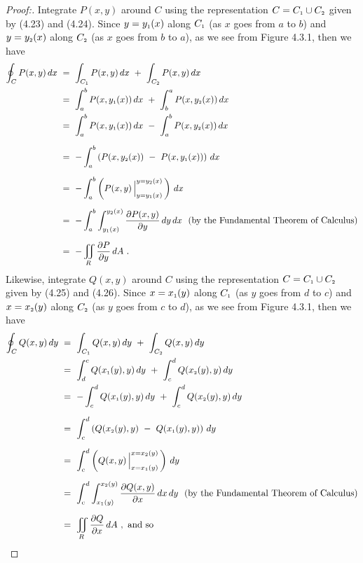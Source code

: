 \begin{proofbar}
\begin{proof}[Proof:]
 \par\noindent Integrate $P(x,y)$ around $C$ using the representation $C = C_{\scriptscriptstyle 1} \cup C_{\scriptscriptstyle 2}$ given by (4.23)
 and (4.24).
Since $y = y_{\scriptscriptstyle 1}(x)$ along $C_{\scriptscriptstyle 1}$ (as $x$ goes from $a$ to $b$) and $y = y_{\scriptscriptstyle 2}(x)$ along
 $C_{\scriptscriptstyle 2}$ (as $x$ goes from $b$ to $a$), as we see from Figure 4.3.1, then we have
 \begin{align*}
  \oint_C P(x,y)\,dx ~&=~ \int_{C_{\scriptscriptstyle 1}} P(x,y)\,dx ~+~ \int_{C_{\scriptscriptstyle 2}} P(x,y)\,dx\\
   &=~ \int_a^b P(x,y_{\scriptscriptstyle 1}(x))\,dx ~+~ \int_b^a P(x,y_{\scriptscriptstyle 2}(x))\,dx\\
   &=~ \int_a^b P(x,y_{\scriptscriptstyle 1}(x))\,dx ~-~ \int_a^b P(x,y_{\scriptscriptstyle 2}(x))\,dx\\[6pt]
   &=~ -\int_a^b \left( P(x,y_{\scriptscriptstyle 2}(x)) ~-~ P(x,y_{\scriptscriptstyle 1}(x)) \right)\,dx\\[6pt]
   &=~ -\int_a^b \left( P(x,y) \,\Big|_{y = y_{\scriptscriptstyle 1}(x)}^{y = y_{\scriptscriptstyle 2}(x)} \,\right)\,dx\\[6pt]
   &=~ -\int_a^b \int_{y_{\scriptscriptstyle 1}(x)}^{y_{\scriptscriptstyle 2}(x)} \frac{\partial P(x,y)}{\partial y}\,dy\,dx ~~\text{(by the
    Fundamental Theorem of Calculus)}\\[6pt]
   &=~ -\iint\limits_{R} \frac{\partial P}{\partial y}\,dA ~.
 \end{align*}
 Likewise, integrate $Q(x,y)$ around $C$ using the representation $C = C_{\scriptscriptstyle 1} \cup C_{\scriptscriptstyle 2}$ given by (4.25) and
 (4.26). Since $x = x_{\scriptscriptstyle 1}(y)$ along $C_{\scriptscriptstyle 1}$ (as $y$ goes from $d$ to $c$) and $x = x_{\scriptscriptstyle 2}(y)$ along
 $C_{\scriptscriptstyle 2}$ (as $y$ goes from $c$ to $d$), as we see from Figure 4.3.1, then we have
 \begin{align*}
  \oint_C Q(x,y)\,dy ~&=~ \int_{C_{\scriptscriptstyle 1}} Q(x,y)\,dy ~+~ \int_{C_{\scriptscriptstyle 2}} Q(x,y)\,dy\\
   &=~ \int_d^c Q(x_{\scriptscriptstyle 1}(y),y)\,dy ~+~ \int_c^d Q(x_{\scriptscriptstyle 2}(y),y)\,dy\\
   &=~ -\int_c^d Q(x_{\scriptscriptstyle 1}(y),y)\,dy ~+~ \int_c^d Q(x_{\scriptscriptstyle 2}(y),y)\,dy\\[6pt]
   &=~ \int_c^d \left( Q(x_{\scriptscriptstyle 2}(y),y) ~-~ Q(x_{\scriptscriptstyle 1}(y),y) \right)\,dy\\[6pt]
   &=~ \int_c^d \left( Q(x,y) \,\Big|_{x = x_{\scriptscriptstyle 1}(y)}^{x = x_{\scriptscriptstyle 2}(y)} \,\right)\,dy\\[6pt]
   &=~ \int_c^d \int_{x_{\scriptscriptstyle 1}(y)}^{x_{\scriptscriptstyle 2}(y)} \frac{\partial Q(x,y)}{\partial x}\,dx\,dy ~~\text{(by the
    Fundamental Theorem of Calculus)}\\[6pt]
   &=~ \iint\limits_{R} \frac{\partial Q}{\partial x}\,dA ~,~\text{and so}
 \end{align*}


\end{proof}
\end{proofbar}
